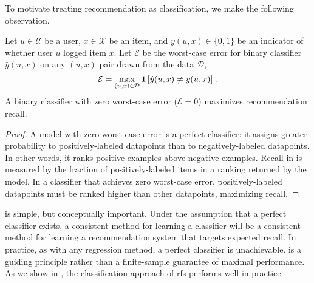 To motivate treating recommendation as classification, we make the following observation.
\begin{proposition}
\label{prop:maximizing-recall}
Let $u \in \mathcal{U}$ be a user, $x \in \mathcal{X}$ be an item, and
$y(u,x) \in \{0,1\}$ be an indicator of whether user $u$ logged item $x$. Let
$\mathcal{E}$ be the worst-case error for binary classifier $\hat{y}(u,x)$ on
any $(u,x)$ pair drawn from the data $\mathcal{D}$,
\begin{equation*}
  \mathcal{E} = \max_{(u, x) \in \mathcal{D}} \boldsymbol{\mathbf{1}}\left[ \hat y(u, x) \neq y(u, x) \right] \, .
\end{equation*}
A binary classifier with zero worst-case error ($\mathcal{E}=0$) maximizes
recommendation recall.
\end{proposition}
\begin{proof}
  A model with zero worst-case error is a perfect classifier: it assigns greater
  probability to positively-labeled datapoints than to negatively-labeled
  datapoints. In other words, it ranks positive examples above negative
  examples. Recall in  is measured by the fraction of
  positively-labeled items in a ranking returned by the model. In a classifier
  that achieves zero worst-case error, positively-labeled datapoints must be
  ranked higher than other datapoints, maximizing recall.
\end{proof}

 is simple, but conceptually important. Under the
assumption that a perfect classifier exists, a consistent method for learning a
classifier will be a consistent method for learning a recommendation system that
targets expected recall. In practice, as with any regression method, a perfect
classifier is unachievable.  is a guiding principle
rather than a finite-sample guarantee of maximal performance. As we show in
, the classification approach of \gls{rfs} performs well
in practice.

